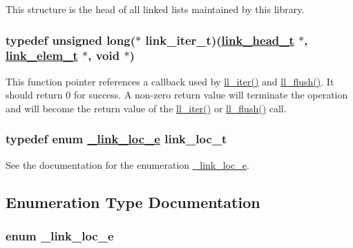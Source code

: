 This structure is the head of all linked lists maintained by this library. \hypertarget{group__dbprim__link_a2}{
\subsubsection[link\_\-iter\_\-t]{\setlength{\rightskip}{0pt plus 5cm}typedef unsigned long($\ast$ link\_\-iter\_\-t)(\hyperlink{group__dbprim__link_a0}{link\_\-head\_\-t} $\ast$, \hyperlink{group__dbprim__link_a1}{link\_\-elem\_\-t} $\ast$, void $\ast$)}}
\label{group__dbprim__link_a2}


This function pointer references a callback used by \hyperlink{group__dbprim__link_a10}{ll\_\-iter()} and \hyperlink{group__dbprim__link_a11}{ll\_\-flush()}. It should return 0 for success. A non-zero return value will terminate the operation and will become the return value of the \hyperlink{group__dbprim__link_a10}{ll\_\-iter()} or \hyperlink{group__dbprim__link_a11}{ll\_\-flush()} call. \hypertarget{group__dbprim__link_a4}{
\subsubsection[link\_\-loc\_\-t]{\setlength{\rightskip}{0pt plus 5cm}typedef enum \hyperlink{group__dbprim__link_a26}{\_\-link\_\-loc\_\-e} link\_\-loc\_\-t}}
\label{group__dbprim__link_a4}


See the documentation for the enumeration \hyperlink{group__dbprim__link_a26}{\_\-link\_\-loc\_\-e}. 

\subsection{Enumeration Type Documentation}
\hypertarget{group__dbprim__link_a26}{
\subsubsection[\_\-link\_\-loc\_\-e]{\setlength{\rightskip}{0pt plus 5cm}enum \_\-link\_\-loc\_\-e}}
\label{group__dbprim__link_a26}



